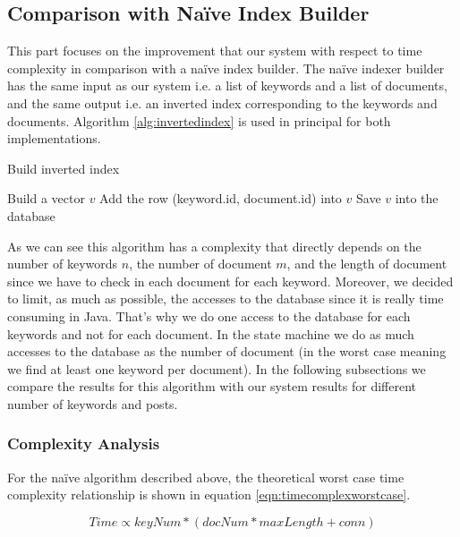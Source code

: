 \documentclass[10pt]{article}
\begin{document}
\subsection{Comparison with Na\"{i}ve Index Builder}
This part focuses on the improvement that our system with respect to
time complexity in comparison with a na\"{i}ve index builder. The na\"{i}ve
indexer builder has the same input as our system i.e. a list of
keywords and a list of documents, and the same output i.e. an inverted
index corresponding to the keywords and documents. Algorithm
\ref{alg:invertedindex} is used in principal for both implementations.


\begin{algorithm}
\caption{Build inverted index}
\label{alg:invertedindex}
\begin{algorithmic}
  \STATE Build a vector $v$
  \STATE Add the row (keyword.id, document.id) into $v$
  \ENDFOR
  \STATE Save $v$ into the database
  \ENDFOR
\end{algorithmic}
\end{algorithm}

As we can see this algorithm has a complexity that directly depends on
the number of keywords $n$, the number of document $m$, and the length
of document since we have to check in each document for each
keyword. Moreover, we decided to limit, as much as possible, the
accesses to the database since it is really time consuming in
Java. That’s why we do one access to the database for each keywords
and not for each document. In the state machine we do as much accesses
to the database as the number of document (in the worst case meaning
we find at least one keyword per document). In the following
subsections we compare the results for this algorithm with our system
results for different number of keywords and posts.


\subsubsection{Complexity Analysis}
For the na\"{i}ve algorithm described above, the theoretical worst
case time complexity relationship is shown in equation
\ref{eqn:timecomplexworstcase}.  

\begin{equation}
\label{eqn:timecomplexworstcase}
Time \propto keyNum * ( docNum * maxLength + conn)
\end{equation}
\end{document}
